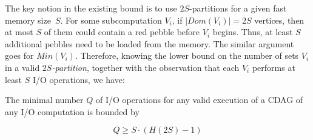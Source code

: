 %
The key notion in the existing bound is to use $2S$-partitions for a given fast
memory size~$S$.
%
For some subcomputation $V_i$, if $|Dom(V_i)| = 2S$ vertices, then at most $S$
of them could contain a red pebble before $V_i$ begins.  Thus, at least $S$
additional pebbles need to be loaded from the memory.  The similar argument
goes for $Min(V_i)$. Therefore, knowing the lower bound on the number of sets
$V_i$ in a valid \emph{$2S$-partition}, together with the observation that each
$V_i$ performs at least $S$ I/O operations, we have:
%
%

\begin{lma}
	The minimal number $Q$ of I/O operations for any valid execution of a CDAG 
	of
	any I/O computation is bounded by
	
	\begin{equation}
	\label{eq:redbluebound}
	Q \ge S \cdot (H(2S) - 1)
	\end{equation}
\end{lma}

